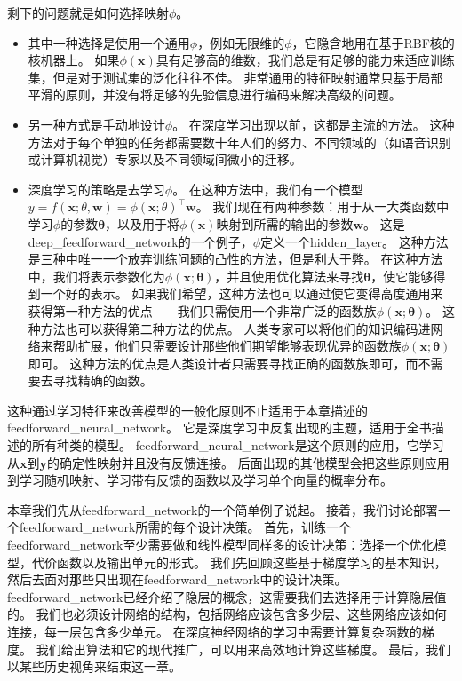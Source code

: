 剩下的问题就是如何选择映射$\phi$。
\begin{itemize}
\item 其中一种选择是使用一个通用$\phi$，例如无限维的$\phi$，它隐含地用在基于RBF核的核机器上。
如果$\phi(\bm{x})$具有足够高的维数，我们总是有足够的能力来适应训练集，但是对于测试集的泛化往往不佳。
非常通用的特征映射通常只基于局部平滑的原则，并没有将足够的先验信息进行编码来解决高级的问题。

\item 另一种方式是手动地设计$\phi$。
在深度学习出现以前，这都是主流的方法。
这种方法对于每个单独的任务都需要数十年人们的努力、不同领域的（如语音识别或计算机视觉）专家以及不同领域间微小的迁移。

\item 深度学习的策略是去学习$\phi$。
在这种方法中，我们有一个模型$y = f(\bm{x};\theta, \bm{w}) = \phi(\bm{x}; \theta)^\top \bm{w}$。
我们现在有两种参数：用于从一大类函数中学习$\phi$的参数$\bm{\theta}$，以及用于将$\phi(\bm{x})$映射到所需的输出的参数$\bm{w}$。
这是\gls{deep_feedforward_network}的一个例子，$\phi$定义一个\gls{hidden_layer}。
这种方法是三种中唯一一个放弃训练问题的凸性的方法，但是利大于弊。
在这种方法中，我们将表示参数化为$\phi(\bm{x}; \bm{\theta})$，并且使用优化算法来寻找$\bm{\theta}$，使它能够得到一个好的表示。
如果我们希望，这种方法也可以通过使它变得高度通用来获得第一种方法的优点——我们只需使用一个非常广泛的函数族$\phi(\bm{x}; \bm{\theta})$。
这种方法也可以获得第二种方法的优点。
人类专家可以将他们的知识编码进网络来帮助扩展，他们只需要设计那些他们期望能够表现优异的函数族$\phi(\bm{x}; \bm{\theta})$即可。
这种方法的优点是人类设计者只需要寻找正确的函数族即可，而不需要去寻找精确的函数。
\end{itemize}

这种通过学习特征来改善模型的一般化原则不止适用于本章描述的\gls{feedforward_neural_network}。
它是深度学习中反复出现的主题，适用于全书描述的所有种类的模型。
\gls{feedforward_neural_network}是这个原则的应用，它学习从$\bm{x}$到$\bm{y}$的确定性映射并且没有反馈连接。
后面出现的其他模型会把这些原则应用到学习随机映射、学习带有反馈的函数以及学习单个向量的概率分布。


本章我们先从\gls{feedforward_network}的一个简单例子说起。
接着，我们讨论部署一个\gls{feedforward_network}所需的每个设计决策。
首先，训练一个\gls{feedforward_network}至少需要做和线性模型同样多的设计决策：选择一个优化模型，代价函数以及输出单元的形式。
我们先回顾这些基于梯度学习的基本知识，然后去面对那些只出现在\gls{feedforward_network}中的设计决策。
\gls{feedforward_network}已经介绍了隐层的概念，这需要我们去选择用于计算隐层值的。
我们也必须设计网络的结构，包括网络应该包含多少层、这些网络应该如何连接，每一层包含多少单元。
在深度神经网络的学习中需要计算复杂函数的梯度。
我们给出算法和它的现代推广，可以用来高效地计算这些梯度。
最后，我们以某些历史视角来结束这一章。

